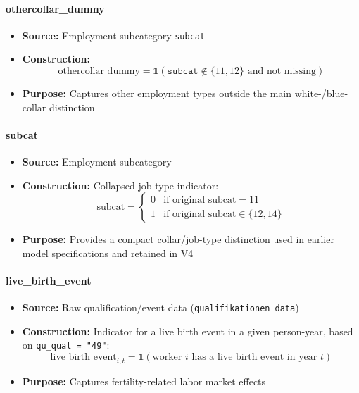 \documentclass{article}
\begin{document}
\paragraph{othercollar\_dummy}
\begin{itemize}
    \item \textbf{Source:} Employment subcategory \texttt{subcat}
    \item \textbf{Construction:}
    \begin{equation}
        \text{othercollar\_dummy} = \mathbb{1}(\texttt{subcat} \notin \{11,12\} \text{ and not missing})
    \end{equation}
    \item \textbf{Purpose:} Captures other employment types outside the main white-/blue-collar distinction
\end{itemize}

\paragraph{subcat}
\begin{itemize}
    \item \textbf{Source:} Employment subcategory
    \item \textbf{Construction:} Collapsed job-type indicator:
    \begin{equation}
        \text{subcat} =
        \begin{cases}
            0 & \text{if original subcat} = 11\\
            1 & \text{if original subcat} \in \{12,14\}
        \end{cases}
    \end{equation}
    \item \textbf{Purpose:} Provides a compact collar/job-type distinction used in earlier model specifications and retained in V4
\end{itemize}

\paragraph{live\_birth\_event}
\begin{itemize}
    \item \textbf{Source:} Raw qualification/event data (\texttt{qualifikationen\_data})
    \item \textbf{Construction:} Indicator for a live birth event in a given person-year, based on \texttt{qu\_qual = "49"}:
    \begin{equation}
        \text{live\_birth\_event}_{i,t} = \mathbb{1}(\text{worker } i \text{ has a live birth event in year } t)
    \end{equation}
    \item \textbf{Purpose:} Captures fertility-related labor market effects
\end{itemize}
\end{document}
